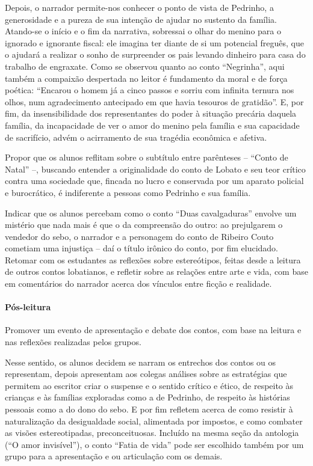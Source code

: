 \documentclass[11pt]{extarticle}
\begin{document}
Depois, o narrador permite-nos conhecer o ponto de vista de Pedrinho, a
generosidade e a pureza de sua intenção de ajudar no sustento da
família. Atando-se o início e o fim da narrativa, sobressai o olhar do
menino para o ignorado e ignorante fiscal: ele imagina ter diante de si
um potencial freguês, que o ajudará a realizar o sonho de surpreender os
pais levando dinheiro para casa do trabalho de engraxate. Como se
observou quanto ao conto ``Negrinha'', aqui também a compaixão
despertada no leitor é fundamento da moral e de força poética: ``Encarou
o homem já a cinco passos e sorriu com infinita ternura nos olhos, num
agradecimento antecipado em que havia tesouros de gratidão''. E, por
fim, da insensibilidade dos representantes do poder à situação precária
daquela família, da incapacidade de ver o amor do menino pela família e
sua capacidade de sacrifício, advém o acirramento de sua tragédia
econômica e afetiva.

Propor que os alunos reflitam sobre o subtítulo entre parênteses --
``Conto de Natal'' --, buscando entender a originalidade do conto de
Lobato e seu teor crítico contra uma sociedade que, fincada no lucro e
conservada por um aparato policial e burocrático, é indiferente a
pessoas como Pedrinho e sua família.

Indicar que os alunos percebam como o conto ``Duas cavalgaduras''
envolve um mistério que nada mais é que o da compreensão do outro: ao
prejulgarem o vendedor do sebo, o narrador e a personagem do conto de
Ribeiro Couto cometiam uma injustiça -- daí o título irônico do conto,
por fim elucidado. Retomar com os estudantes as reflexões sobre
estereótipos, feitas desde a leitura de outros contos lobatianos, e
refletir sobre as relações entre arte e vida, com base em comentários do
narrador acerca dos vínculos entre ficção e realidade.

\asterisc\paragraph{Pós-leitura}

Promover um evento de apresentação e debate dos contos, com base na
leitura e nas reflexões realizadas pelos grupos.

Nesse sentido, os alunos decidem se narram os entrechos dos contos ou os
representam, depois apresentam aos colegas análises sobre as estratégias
que permitem ao escritor criar o suspense e o sentido crítico e ético,
de respeito às crianças e às famílias exploradas como a de Pedrinho, de
respeito às histórias pessoais como a do dono do sebo. E por fim
refletem acerca de como resistir à naturalização da desigualdade social,
alimentada por impostos, e como combater as visões estereotipadas,
preconceituosas. Incluído na mesma seção da antologia (``O amor
invisível''), o conto ``Fatia de vida'' pode ser escolhido também por um
grupo para a apresentação e ou articulação com os demais.
\end{document}
